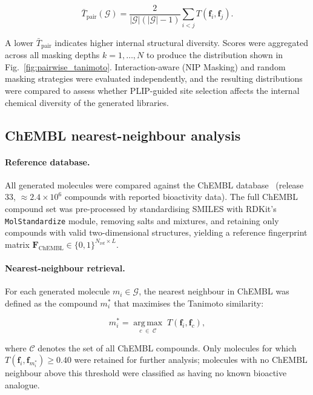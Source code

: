 \documentclass[a4paper,12pt]{article}
\begin{document}
\begin{equation}
    \bar{T}_{\mathrm{pair}}(\mathcal{G})
    = \frac{2}{|\mathcal{G}|(|\mathcal{G}|-1)}
      \sum_{i < j} T(\mathbf{f}_i, \mathbf{f}_j).
    \label{eq:mean_pairwise}
\end{equation}
 
\noindent A lower $\bar{T}_{\mathrm{pair}}$ indicates higher
internal structural diversity.
Scores were aggregated across all masking depths $k = 1, \ldots, N$
to produce the distribution shown in
Fig.~\ref{fig:pairwise_tanimoto}.
Interaction-aware (NIP Masking) and random masking strategies were evaluated
independently, and the resulting distributions were compared to
assess whether PLIP-guided site selection affects the internal
chemical diversity of the generated libraries.
 
\subsection{ChEMBL nearest-neighbour analysis }
 
\paragraph{Reference database.}
All generated molecules were compared against the ChEMBL
database~\cite{gaulton2012chembl} (release 33, $\approx 2.4 \times
10^6$ compounds with reported bioactivity data).
The full ChEMBL compound set was pre-processed by standardising
SMILES with RDKit's \texttt{MolStandardize} module, removing
salts and mixtures, and retaining only compounds with valid
two-dimensional structures, yielding a reference fingerprint
matrix $\mathbf{F}_{\mathrm{ChEMBL}} \in \{0,1\}^{N_{\mathrm{ref}}
\times L}$.
 
\paragraph{Nearest-neighbour retrieval.}
For each generated molecule $m_i \in \mathcal{G}$, the
nearest neighbour in ChEMBL was defined as the compound
$m^{*}_i$ that maximises the Tanimoto similarity:
 
\begin{equation}
    m^{*}_i = \operatorname*{arg\,max}_{c \;\in\; \mathcal{C}}
              \; T(\mathbf{f}_i, \mathbf{f}_c),
    \label{eq:nn_retrieval}
\end{equation}
 
\noindent where $\mathcal{C}$ denotes the set of all ChEMBL
compounds.
Only molecules for which $T(\mathbf{f}_i, \mathbf{f}_{m^{*}_i})
\geq 0.40$ were retained for further analysis; molecules with no
ChEMBL neighbour above this threshold were classified as having no
known bioactive analogue.
 
\end{document}
